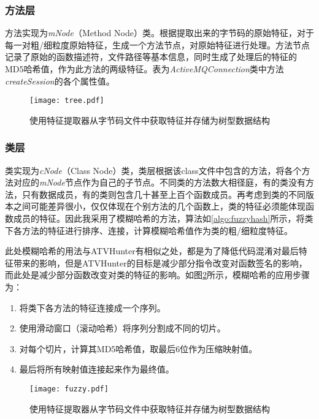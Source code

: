 \subsubsection{方法层}

方法实现为\textit{mNode}（Method Node）类。根据提取出来的字节码的原始特征，对于每一对粗/细粒度原始特征，生成一个方法节点，对原始特征进行处理。方法节点记录了原始的函数描述符，文件路径等基本信息，同时生成了处理后的特征的MD5哈希值，作为此方法的两级特征。表为\textit{ActiveMQConnection}类中方法\textit{createSession}的各个属性值。

\begin{figure}[!htp]
  \centering
  \texttt{[image: tree.pdf]} \\
  \caption{使用特征提取器从字节码文件中获取特征并存储为树型数据结构}
 \label{fig:tree}
\end{figure}

\subsubsection{类层}

类实现为\textit{cNode}（Class Node）类，类层根据该class文件中包含的方法，将各个方法对应的\textit{mNode}节点作为自己的子节点。不同类的方法数大相径庭，有的类没有方法，只有数据成员，有的类则包含几十甚至上百个函数成员。再考虑到类的不同版本之间可能差异很小，仅仅体现在个别方法的几个函数上，类的特征必须能体现函数成员的特征。因此我采用了模糊哈希的方法，算法如\ref{algo:fuzzyhash}所示，将类下各方法的特征进行排序、连接，计算模糊哈希值作为类的粗/细粒度特征。

此处模糊哈希的用法与ATVHunter\cite{zhan2021atvhunter}有相似之处，都是为了降低代码混淆对最后特征带来的影响，但是ATVHunter的目标是减少部分指令改变对函数签名的影响，而此处是减少部分函数改变对类的特征的影响。如图\ref{fig:fuzzy}所示，模糊哈希的应用步骤为：
\begin{enumerate}
\item{将类下各方法的特征连接成一个序列。}
\item{使用滑动窗口（滚动哈希）将序列分割成不同的切片。}
\item{对每个切片，计算其MD5哈希值，取最后6位作为压缩映射值。}
\item{最后将所有映射值连接起来作为最终值。}
\end{enumerate}

\begin{figure}[!htp]
  \centering
  \texttt{[image: fuzzy.pdf]} \\
  \caption{使用特征提取器从字节码文件中获取特征并存储为树型数据结构}
 \label{fig:fuzzy}
\end{figure}



